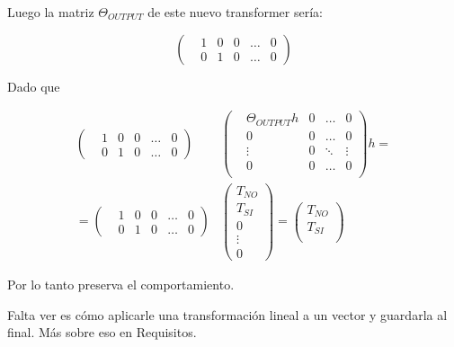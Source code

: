 Luego la matriz $\Theta_{OUTPUT}$ de este nuevo transformer sería:

\begin{equation*}
    \left(\begin{matrix}
        &1 &0 &0 &\dots &0 \\
        &0 &1 &0 &\dots &0 
    \end{matrix}\right)
\end{equation*}

Dado que 

\begin{align*}
    \left(\begin{matrix}
        &1 &0 &0 &\dots &0 \\
        &0 &1 &0 &\dots &0 
    \end{matrix}\right)
    &\left(\begin{matrix}
        &\Theta_{OUTPUT}h &0 &\dots  &0 \\
        &0                &0 &\dots  &0 \\
        &\vdots           &0 &\ddots &\vdots \\
        &0                &0 &\dots  &0 \\
    \end{matrix}\right)h = \\
    = \left(\begin{matrix}
        &1 &0 &0 &\dots &0 \\
        &0 &1 &0 &\dots &0 
    \end{matrix}\right)
    &\left(\begin{matrix}
        T_{NO} \\
        T_{SI} \\ 
        0 \\
        \vdots \\
        0
    \end{matrix}\right) = 
    \left(\begin{matrix}
        T_{NO} \\
        T_{SI} \\ 
    \end{matrix}\right)
\end{align*}

Por lo tanto preserva el comportamiento.

Falta ver es cómo aplicarle una transformación lineal a un vector y guardarla al final. Más sobre eso en Requisitos.
